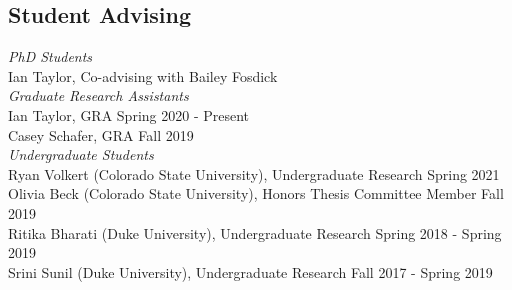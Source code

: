 \documentclass[margin,line]{res}
\begin{document}
\begin{resume}
% 

\section{\sc Student Advising}

{\em PhD Students} \hfill \\
Ian Taylor, Co-advising with Bailey Fosdick \\

\vspace{-.3cm}
{\em Graduate Research Assistants} \hfill \\
Ian Taylor, GRA \hfill Spring 2020 - Present \\
Casey Schafer, GRA \hfill Fall 2019 \\

\vspace{-.3cm}
{\em Undergraduate Students} \hfill \\
Ryan Volkert (Colorado State University), Undergraduate Research \hfill Spring 2021 \\
Olivia Beck (Colorado State University), Honors Thesis Committee Member \hfill Fall 2019 \\
Ritika Bharati (Duke University), Undergraduate Research \hfill Spring 2018 - Spring 2019\\
Srini Sunil (Duke University), Undergraduate Research \hfill Fall 2017 - Spring 2019



\end{resume}
\end{document}
